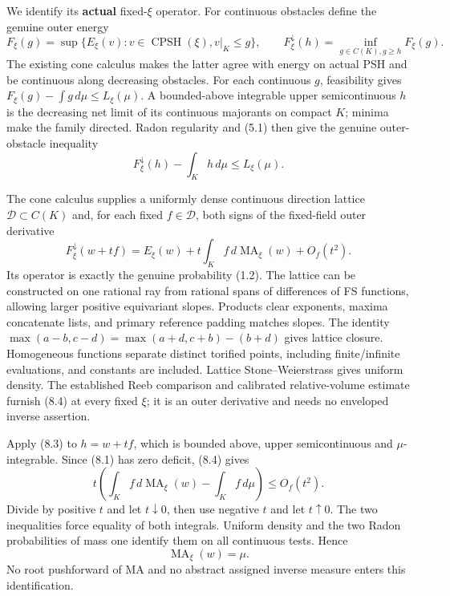 \documentclass[
  10pt,
]{article}
\begin{document}
We identify its \textbf{actual} fixed-\(\xi\) operator. For continuous
obstacles define the genuine outer energy \[
 F_\xi(g)=\sup\{E_\xi(v):v\in\operatorname{CPSH}(\xi), v|_K\leq g\},
 \qquad
 F_\xi^\downarrow(h)=\inf_{g\in C(K),g\geq h}F_\xi(g).
                                                               \tag{8.2}
\] The existing cone calculus makes the latter agree with energy on
actual PSH and be continuous along decreasing obstacles. For each
continuous \(g\), feasibility gives
\(F_\xi(g)-\int g\,d\mu\leq L_\xi(\mu)\). A bounded-above integrable
upper semicontinuous \(h\) is the decreasing net limit of its continuous
majorants on compact \(K\); minima make the family directed. Radon
regularity and (5.1) then give the genuine outer-obstacle inequality \[
                F_\xi^\downarrow(h)-\int_Kh\,d\mu\leq L_\xi(\mu).
                                                               \tag{8.3}
\]

The cone calculus supplies a uniformly dense continuous direction
lattice \(\mathcal D\subset C(K)\) and, for each fixed
\(f\in\mathcal D\), both signs of the fixed-field outer derivative \[
 F_\xi^\downarrow(w+tf)
      =E_\xi(w)+t\int_K f\,d\operatorname{MA}_\xi(w)+O_f(t^2).
                                                               \tag{8.4}
\] Its operator is exactly the genuine probability (1.2). The lattice
can be constructed on one rational ray from rational spans of
differences of FS functions, allowing larger positive equivariant
slopes. Products clear exponents, maxima concatenate lists, and primary
reference padding matches slopes. The identity
\(\max(a-b,c-d)=\max(a+d,c+b)-(b+d)\) gives lattice closure. Homogeneous
functions separate distinct torified points, including finite/infinite
evaluations, and constants are included. Lattice Stone--Weierstrass
gives uniform density. The established Reeb comparison and calibrated
relative-volume estimate furnish (8.4) at every fixed \(\xi\); it is an
outer derivative and needs no enveloped inverse assertion.

Apply (8.3) to \(h=w+tf\), which is bounded above, upper semicontinuous
and \(\mu\)-integrable. Since (8.1) has zero deficit, (8.4) gives \[
 t\left(\int_K f\,d\operatorname{MA}_\xi(w)-\int_K f\,d\mu\right)
                                                        \leq O_f(t^2).
\] Divide by positive \(t\) and let \(t\downarrow0\), then use negative
\(t\) and let \(t\uparrow0\). The two inequalities force equality of
both integrals. Uniform density and the two Radon probabilities of mass
one identify them on all continuous tests. Hence \[
                          \operatorname{MA}_\xi(w)=\mu.        \tag{8.5}
\] No root pushforward of MA and no abstract assigned inverse measure
enters this identification.
\end{document}
